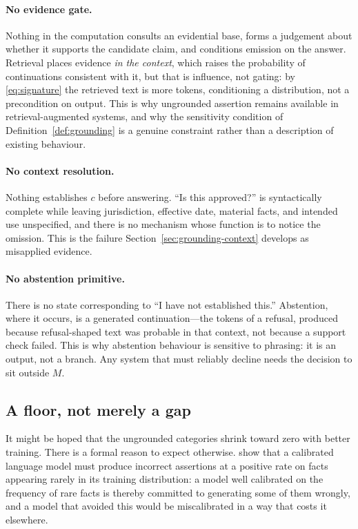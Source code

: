 \documentclass[11pt]{article}
\theoremstyle{plain}
\theoremstyle{definition}
\begin{document}
\paragraph{No evidence gate.} Nothing in the computation consults an evidential
base, forms a judgement about whether it supports the candidate claim, and
conditions emission on the answer. Retrieval places evidence \emph{in the
context}, which raises the probability of continuations consistent with it, but
that is influence, not gating: by \eqref{eq:signature} the retrieved text is more
tokens, conditioning a distribution, not a precondition on output. This is why ungrounded
assertion remains available in retrieval-augmented systems, and why the
sensitivity condition of Definition~\ref{def:grounding} is a genuine constraint
rather than a description of existing behaviour.

\paragraph{No context resolution.} Nothing establishes $c$ before answering.
``Is this approved?'' is syntactically complete while leaving jurisdiction,
effective date, material facts, and intended use unspecified, and there is no
mechanism whose function is to notice the omission. This is the failure
Section~\ref{sec:grounding-context} develops as misapplied evidence.

\paragraph{No abstention primitive.} There is no state corresponding to ``I have
not established this.'' Abstention, where it occurs, is a generated
continuation---the tokens of a refusal, produced because refusal-shaped text was
probable in that context, not because a support check failed. This is why
abstention behaviour is sensitive to phrasing: it is an output, not a branch. Any
system that must reliably decline needs the decision to sit outside $M$.

\subsection{A floor, not merely a gap}
\label{sec:floor}

It might be hoped that the ungrounded categories shrink toward zero with better
training. There is a formal reason to expect otherwise.
\citet{kalai2024} show that a calibrated language model must produce incorrect
assertions at a positive rate on facts appearing rarely in its training
distribution: a model well calibrated on the frequency of rare facts is thereby
committed to generating some of them wrongly, and a model that avoided this would
be miscalibrated in a way that costs it elsewhere.
\end{document}
